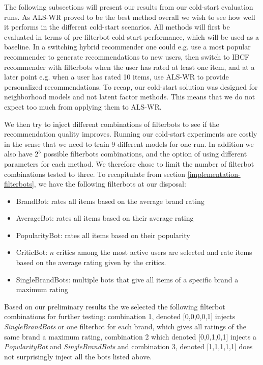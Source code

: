The following subsections will present our results from our cold-start evaluation runs. As ALS-WR proved to be the best method overall we wish to
see how well it performs in the different cold-start scenarios. All methods will first be evaluated in terms of pre-filterbot cold-start performance,
which will be used as a baseline. In a switching hybrid recommender one could e.g. use a most popular recommender to generate recommendations to new users,
then switch to IBCF recommender with filterbots when the user has rated at least one item, and at a later point e.g. when a user has rated 10 items,
use ALS-WR to provide personalized recommendations. To recap, our cold-start solution was designed for neighborhood models and not latent factor methods.
This means that we do not expect too much from applying them to ALS-WR.

We then try to inject different combinations of filterbots to see if the recommendation quality improves. Running our cold-start experiments are costly in the sense
that we need to train 9 different models for one run. In addition we also have $2^5$ possible filterbots combinations, and
the option of using different parameters for each method. We therefore chose to limit the number of filterbot combinations tested to three.
To recapitulate from section \ref{implementation-filterbots}, we have the following filterbots at our disposal:

\begin{itemize}
\item BrandBot: rates all items based on the average brand rating
\item AverageBot: rates all items based on their average rating
\item PopularityBot: rates all items based on their popularity
\item CriticBot: $n$ critics among the most active users are selected and rate items based on the average
	  rating given by the critics.
\item SingleBrandBots: multiple bots that give all items of a specific brand a maximum rating
\end{itemize}

Based on our preliminary results the we selected the following filterbot combinations for further testing: combination 1, denoted [0,0,0,0,1]
injects \emph{SingleBrandBots} or one filterbot for each brand, which gives all ratings of the same brand a maximum rating, combination 2 which denoted [0,0,1,0,1] injects
a \emph{PopularityBot} and \emph{SingleBrandBots} and combination 3, denoted [1,1,1,1,1] does not surprisingly inject all the bots listed above.


